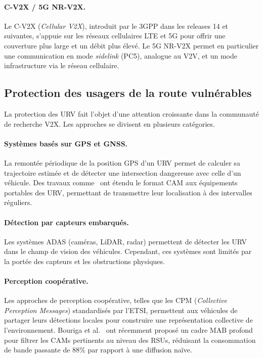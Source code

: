 \documentclass[12pt,a4paper]{article}
\begin{document}
\paragraph{C-V2X / 5G NR-V2X.}
Le C-V2X (\textit{Cellular V2X}), introduit par le 3GPP dans les releases 14 et
suivantes, s'appuie sur les réseaux cellulaires LTE et 5G pour offrir une
couverture plus large et un débit plus élevé. Le 5G NR-V2X permet en particulier
une communication en mode \textit{sidelink} (PC5), analogue au V2V, et un mode
infrastructure via le réseau cellulaire.

\subsection{Protection des usagers de la route vulnérables}

La protection des URV fait l'objet d'une attention croissante dans la communauté
de recherche V2X. Les approches se divisent en plusieurs catégories.

\paragraph{Systèmes basés sur GPS et GNSS.}
La remontée périodique de la position GPS d'un URV permet de calculer sa trajectoire
estimée et de détecter une intersection dangereuse avec celle d'un véhicule. Des
travaux comme~\cite{vru_cam} ont étendu le format CAM aux équipements portables des
URV, permettant de transmettre leur localisation à des intervalles réguliers.

\paragraph{Détection par capteurs embarqués.}
Les systèmes ADAS (caméras, LiDAR, radar) permettent de détecter les URV dans
le champ de vision des véhicules. Cependant, ces systèmes sont limités par la
portée des capteurs et les obstructions physiques.

\paragraph{Perception coopérative.}
Les approches de perception coopérative, telles que les CPM (\textit{Collective
Perception Messages}) standardisés par l'ETSI, permettent aux véhicules de partager
leurs détections locales pour construire une représentation collective de
l'environnement. Bouriga et al.~\cite{bouriga2026} ont récemment proposé un cadre
MAB profond pour filtrer les CAMs pertinents au niveau des RSUs, réduisant la
consommation de bande passante de 88\% par rapport à une diffusion naïve.
\end{document}
